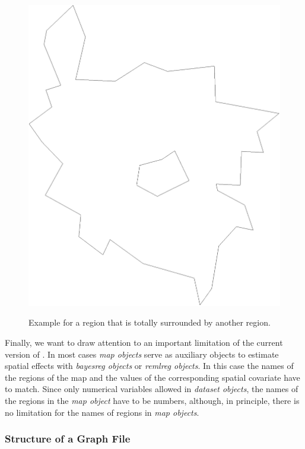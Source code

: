 \begin{figure}[hb]
\centering
\includegraphics [scale=0.3]{grafiken/westin.eps}
{\em\caption{\label{westin} Example for a region that is totally
surrounded by another region.}}
\end{figure}

Finally, we want to draw attention to an important limitation of the current version of \BayesX. In most cases {\em map
objects} serve as auxiliary objects to estimate spatial effects with {\em bayesreg objects} or {\em remlreg objects}. In this case the names of the regions of the map and the values of the corresponding spatial covariate have to match. Since only numerical variables allowed in {\em dataset objects}, the names of the regions in the {\em map object} have to be numbers, although, in principle, there is no limitation for the names of regions in {\em map objects}.

\subsubsection*{Structure of a Graph File}

